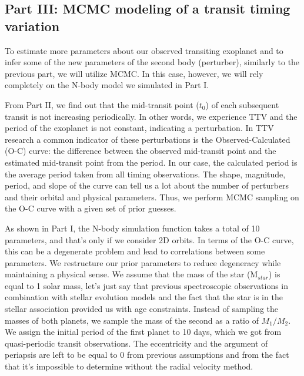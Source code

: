 \documentclass[linenumbers]{aastex631}
\begin{document}
\subsection{Part III: MCMC modeling of a transit timing variation}
\par \vspace{.01cm}
To estimate more parameters about our observed transiting exoplanet and to infer some of the new parameters of the second body (perturber), similarly to the previous part, we will utilize MCMC. In this case, however, we will rely completely on the N-body model we simulated in Part I. 
\par \vspace{.1 cm}
From Part II, we find out that the mid-transit point ($t_{0}$) of each subsequent transit is not increasing periodically. In other words, we experience TTV and the period of the exoplanet is not constant, indicating a perturbation. In TTV research a common indicator of these perturbations is the Observed-Calculated (O-C) curve: the difference between the observed mid-transit point and the estimated mid-transit point from the period. In our case, the calculated period is the average period taken from all timing observations. The shape, magnitude, period, and slope of the curve can tell us a lot about the number of perturbers and their orbital and physical parameters. Thus, we perform MCMC sampling on the O-C curve with a given set of prior guesses.
\par \vspace{.1 cm}
As shown in Part I, the N-body simulation function takes a total of 10 parameters, and that's only if we consider 2D orbits. In terms of the O-C curve, this can be a degenerate problem and lead to correlations between some parameters. We restructure our prior parameters to reduce degeneracy while maintaining a physical sense. We assume that the mass of the star (M$_{star}$) is equal to 1 solar mass, let's just say that previous spectroscopic observations in combination with stellar evolution models and the fact that the star is in the stellar association provided us with age constraints. Instead of sampling the masses of both planets, we sample the mass of the second as a ratio of $M_1/M_2$. We assign the initial period of the first planet to 10 days, which we got from quasi-periodic transit observations. The eccentricity and the argument of periapsis are left to be equal to 0 from previous assumptions and from the fact that it's impossible to determine without the radial velocity method. 
\end{document}
